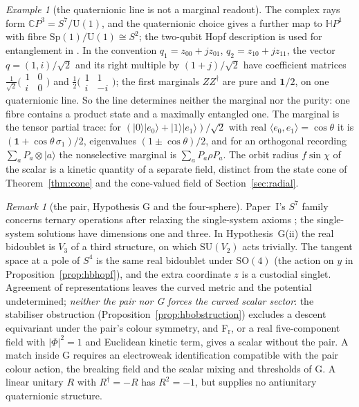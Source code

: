 \documentclass[aps,pra,onecolumn,superscriptaddress,nofootinbib,10pt]{revtex4-2}
\theoremstyle{definition}
\theoremstyle{remark}
\newtheorem{remark}[theorem]{Remark}
\newtheorem{example}[theorem]{Example}
\newcommand{\C}{\mathbb{C}}
\newcommand{\HH}{\mathbb{H}}
\newcommand{\ip}[2]{\langle #1,#2\rangle}
\newcommand{\SU}{\mathrm{SU}}
\newcommand{\SO}{\mathrm{SO}}
\newcommand{\U}{\mathrm{U}}
\begin{document}
\begin{example}[the quaternionic line is not a marginal readout]\label{ex:hbmixed}
The complex rays form $\C P^3=S^7/\U(1)$, and the quaternionic choice gives a further map to $\HH P^1$ with fibre
$\mathrm{Sp}(1)/\U(1)\cong S^2$; the two-qubit Hopf description is used for entanglement in \cite{MD}.  In the convention
$q_1=z_{00}+jz_{01}$, $q_2=z_{10}+jz_{11}$, the vector $q=(1,i)/\sqrt2$ and its right multiple by $(1+j)/\sqrt2$ have coefficient matrices
$\frac1{\sqrt2}\bigl(\begin{smallmatrix}1&0\\ i&0\end{smallmatrix}\bigr)$ and $\frac12\bigl(\begin{smallmatrix}1&1\\ i&-i\end{smallmatrix}\bigr)$; the first marginals $ZZ^\dagger$ are pure and $\mathbf1/2$, on one quaternionic line.  So the
line determines neither the marginal nor the purity: one fibre contains a product state and a
maximally entangled one.  The marginal is the tensor partial trace: for $(\lvert0\rangle\lvert e_0\rangle+\lvert1\rangle\lvert e_1\rangle)/\sqrt2$ with real
$\ip{e_0}{e_1}=\cos\theta$ it is $(\mathbf1+\cos\theta\,\sigma_1)/2$, eigenvalues $(1\pm\cos\theta)/2$, and for an orthogonal recording $\sum_aP_a\otimes\lvert a\rangle$ the
nonselective marginal is $\sum_aP_a\rho P_a$.  The orbit radius $f\sin\chi$ of the scalar is a kinetic quantity of a separate
field, distinct from the state cone of Theorem~\ref{thm:cone} and the cone-valued field of Section~\ref{sec:radial}.
\end{example}

\begin{remark}[the pair, Hypothesis G and the four-sphere]\label{rem:hborigin}
Paper~I's $S^7$ family concerns ternary operations after relaxing the single-system axioms
\cite[Thm.~5.18, Props.~5.16, 5.17]{PaperI}; the single-system solutions have dimensions one and three.  In
Hypothesis~G(ii) the real bidoublet is $V_3$ of a third structure, on which $\SU(V_2)$ acts trivially.  The tangent
space at a pole of $S^4$ is the same real bidoublet under $\SO(4)$ (the action on $y$ in Proposition~\ref{prop:hbhopf}), and
the extra coordinate $z$ is a custodial singlet.  Agreement of representations leaves the curved metric and
the potential undetermined; \emph{neither the pair nor G forces the curved scalar sector}: the stabiliser
obstruction (Proposition~\ref{prop:hbobstruction}) excludes a descent equivariant under the pair's colour
symmetry, and F$_{\mathrm r}$, or a real five-component field with $\lvert\Phi\rvert^2=1$ and Euclidean kinetic term, gives a scalar
without the pair.  A match inside G requires an electroweak identification compatible with the pair
colour action, the breaking field and the scalar mixing and thresholds of G.  A linear unitary $R$ with
$R^\dagger=-R$ has $R^2=-1$, but supplies no antiunitary quaternionic structure.
\end{remark}
\end{document}
